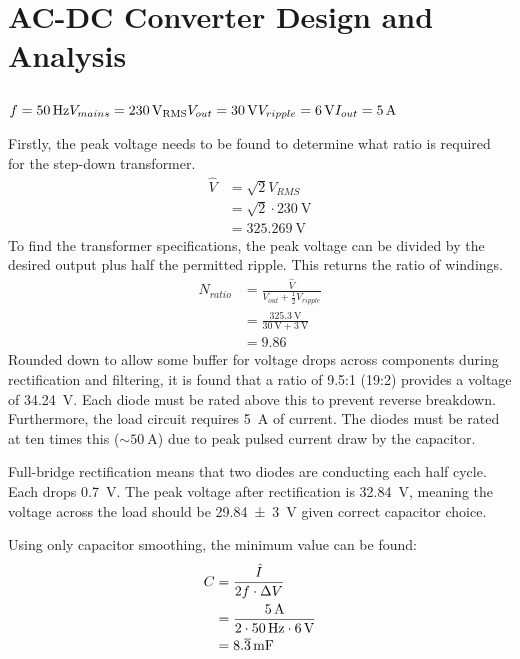 \section{AC-DC Converter Design and Analysis}

\subsection{}
$
    f = \qty{50}{\hertz} \\
    V_{mains} = \qty{230}{\volt_{RMS}} \\
    V_{out} = \qty{30}{\volt} \\
    V_{ripple} = \qty{6}{\volt} \\
    I_{out} = \qty{5}{\ampere}
$

Firstly, the peak voltage needs to be found to determine what ratio is required for the step-down transformer.
\begin{align*}
    \hat{V} & = \sqrt{2} V_{RMS}                \\
            & = \sqrt{2} \cdot \qty{230}{\volt} \\
            & = \qty{325.269}{\volt}
\end{align*}
To find the transformer specifications, the peak voltage can be divided by the desired output plus half
the permitted ripple. This returns the ratio of windings.
\begin{align*}
    N_{ratio} & = \frac{\hat{V}}{V_{out} + \frac{1}{2}V_{ripple}}             \\
              & = \frac{\qty{325.3}{\volt}}{\qty{30}{\volt} + \qty{3}{\volt}} \\
              & = 9.86
\end{align*}
Rounded down to allow some buffer for voltage drops across components during rectification and filtering,
it is found that a ratio of 9.5:1 (19:2) provides a voltage of \qty{34.24}{\volt}. Each diode must be rated above
this to prevent reverse breakdown. Furthermore, the load circuit requires \qty{5}{\ampere} of current. The diodes
must be rated at ten times this ($\sim\qty{50}{\ampere}$) due to peak pulsed current draw by the capacitor.

Full-bridge rectification means that two diodes are conducting each half cycle. Each drops \qty{0.7}{\volt}.
The peak voltage after rectification is \qty{32.84}{\volt}, meaning the voltage across the load
should be \qty{29.84 \pm 3}{\volt} given correct capacitor choice.

Using only capacitor smoothing, the minimum value can be found:
\begin{align*}
    C & = \frac{\hat{I}}{2 f \cdot \Delta V}                                        \\
      & = \frac{ \qty{5}{\ampere} }{ 2 \cdot \qty{50}{\hertz} \cdot \qty{6}{\volt}} \\
      & = \qty[parse-numbers=false]{8.\overline{3}}{\milli\farad}
\end{align*}

